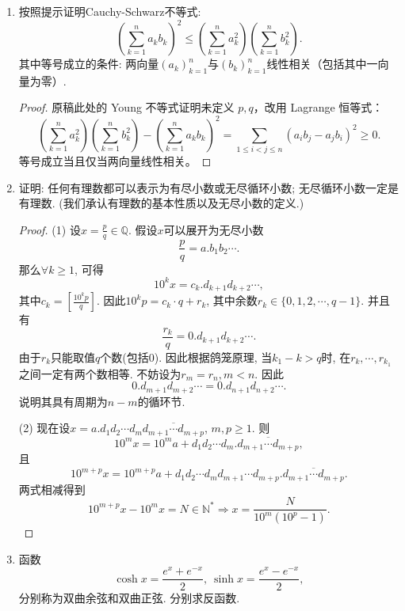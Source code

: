 \documentclass[UTF8,11pt, a4paper, oneside, fontset=none]{ctexbook}
\begin{document}
\begin{enumerate}
\begin{proof}

左边均值不等式直接应用. 右边不等式平方后等价于证明
\[
ab + b c + ca \leq a^2 + b^2 + c^2.
\]
利用均值不等式证明.

\end{proof}

\item 按照提示证明Cauchy-Schwarz不等式:
\[ \left( \sum_{k=1}^{n}a_k b_k\right)^2 \leq \left( \sum_{k=1}^{n}a_k^2\right) \left( \sum_{k=1}^{n}b_k^2\right).
\]
其中等号成立的条件: 两向量$(a_k)_{k=1}^n$与$(b_k)_{k=1}^n$线性相关（包括其中一向量为零）.

\begin{proof}原稿此处的 Young 不等式证明未定义 $p,q$，改用 Lagrange 恒等式：\[\left(\sum_{k=1}^n a_k^2\right)\left(\sum_{k=1}^n b_k^2\right)-\left(\sum_{k=1}^n a_kb_k\right)^2=\sum_{1\le i<j\le n}(a_ib_j-a_jb_i)^2\ge0.\]等号成立当且仅当两向量线性相关。\end{proof}

\item 证明: 任何有理数都可以表示为有尽小数或无尽循环小数; 无尽循环小数一定是有理数. (我们承认有理数的基本性质以及无尽小数的定义.)

\begin{proof}

(1) 设$x = \frac{p}{q} \in \mathbb Q$. 假设$x$可以展开为无尽小数
\[
\frac{p}{q} = a. b_1 b_2 \cdots.
\]
那么$\forall k \geq 1$, 可得
\[
10^k x = c_k. d_{k+1} d_{k+2} \cdots,
\]
其中$c_k = [\frac{10^k p}{q}]$. 因此$10^k p = c_k \cdot q + r_k$, 其中余数$r_k \in \{ 0, 1, 2, \cdots, q-1 \}$. 并且有
\[
\frac{r_k}{q}= 0. d_{k+1} d_{k+2} \cdots.
\]
由于$r_k$只能取值$q$个数(包括0). 因此根据鸽笼原理, 当$k_1 -k >q$时, 在$r_k, \cdots, r_{k_1}$之间一定有两个数相等. 不妨设为$r_m = r_n, m<n$. 因此
\[
0. d_{m+1}d_{m+2} \cdots = 0. d_{n+1} d_{n+2} \cdots.
\]
说明其具有周期为$n-m$的循环节.

(2) 现在设$x = a. d_1d_2 \cdots d_m \overline{d_{m+1} \cdots d_{m+p}}$, $m, p \geq 1$. 则
\[
10^m x = 10^m a + d_1 d_2 \cdots d_m. \overline{d_{m+1} \cdots d_{m+p}},
\]
且
\[
10^{m+p} x = 10^{m+p} a + d_1 d_2 \cdots d_m d_{m+1} \cdots d_{m+p}. \overline{d_{m+1} \cdots d_{m+p}}.
\]
两式相减得到
\[
10^{m+p} x - 10^m x = N \in \mathbb N^* \Rightarrow x = \frac{N}{10^m (10^p -1)}.
\]

\end{proof}

\item 函数
\[
\cosh x = \frac{e^x + e^{-x}}{2}, \ \sinh x = \frac{e^x - e^{-x}}{2},
\]
分别称为双曲余弦和双曲正弦. 分别求反函数.


\end{enumerate}
\end{document}
